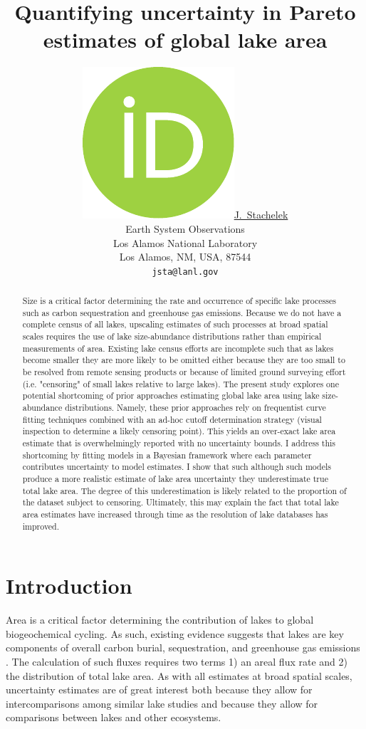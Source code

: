 \documentclass{article}
\title{Quantifying uncertainty in Pareto estimates of global lake area}
\date{} 					%
\author{ \href{https://orcid.org/0000-0002-5924-2464}{\includegraphics[scale=0.06]{orcid.pdf}\hspace{1mm}J.~Stachelek} \\
	Earth System Observations\\
	Los Alamos National Laboratory\\
	Los Alamos, NM, USA, 87544 \\
	\texttt{jsta@lanl.gov} \\
}
\begin{document}
\maketitle

\begin{abstract}
	Size is a critical factor determining the rate and occurrence of specific lake processes such as carbon sequestration and greenhouse gas emissions. Because we do not have a complete census of all lakes, upscaling estimates of such processes at broad spatial scales requires the use of lake size-abundance distributions rather than empirical measurements of area. Existing lake census efforts are incomplete such that as lakes become smaller they are more likely to be omitted either because they are too small to be resolved from remote sensing products or because of limited ground surveying effort (i.e. "censoring" of small lakes relative to large lakes). The present study explores one potential shortcoming of prior approaches estimating global lake area using lake size-abundance distributions. Namely, these prior approaches rely on frequentist curve fitting techniques combined with an ad-hoc cutoff determination strategy (visual inspection to determine a likely censoring point). This yields an over-exact lake area estimate that is overwhelmingly reported with no uncertainty bounds. I address this shortcoming by fitting models in a Bayesian framework where each parameter contributes uncertainty to model estimates. I show that such although such models produce a more realistic estimate of lake area uncertainty they underestimate true total lake area. The degree of this underestimation is likely related to the proportion of the dataset subject to censoring. Ultimately, this may explain the fact that total lake area estimates have increased through time as the resolution of lake databases has improved.
\end{abstract}

\section{Introduction}
Area is a critical factor determining the contribution of lakes to global biogeochemical cycling. As such, existing evidence suggests that lakes are key components of overall carbon burial, sequestration, and greenhouse gas emissions \citep{delsontroGreenhouseGasEmissions2018, kellerGlobalCarbonBudget2021}. The calculation of such fluxes requires two terms 1) an areal flux rate and 2) the distribution of total lake area. As with all estimates at broad spatial scales, uncertainty estimates are of great interest both because they allow for intercomparisons among similar lake studies and because they allow for comparisons between lakes and other ecosystems.
\end{document}

